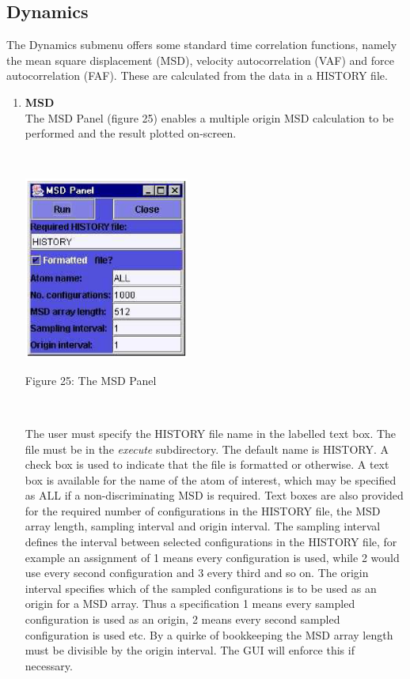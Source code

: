 \subsection{Dynamics}
The Dynamics submenu offers some standard time correlation functions,
namely the mean square displacement (MSD), velocity autocorrelation
(VAF) and force autocorrelation (FAF). These are calculated from the
data in a \DD{} HISTORY file.
\begin{enumerate}
\item {\bf MSD}\\
The MSD Panel (figure 25) enables a multiple origin MSD calculation to be
performed and the result plotted on-screen.

~

\vskip 5mm
\centerline{\includegraphics[height=6cm]{msd.ps}}
\centerline{Figure 25: The MSD Panel}
\vskip 5mm

~

\noindent
The user must specify the HISTORY file name in the labelled text
box. The file must be in the \DD{} {\em execute} subdirectory. The
default name is HISTORY. A check box is used to indicate that the file
is formatted or otherwise. A text box is available for the name of the
atom of interest, which may be specified as ALL if a
non-discriminating MSD is required. Text boxes are also provided for
the required number of configurations in the HISTORY file, the MSD
array length, sampling interval and origin interval. The sampling
interval defines the interval between selected configurations in the
HISTORY file, for example an assignment of 1 means every configuration
is used, while 2 would use every second configuration and 3 every
third and so on. The origin interval specifies which of the sampled
configurations is to be used as an origin for a MSD array. Thus a
specification 1 means every sampled configuration is used as an
origin, 2 means every second sampled configuration is used etc. By a
quirke of bookkeeping the MSD array length must be divisible by the
origin interval. The GUI will enforce this if necessary.


\end{enumerate}
